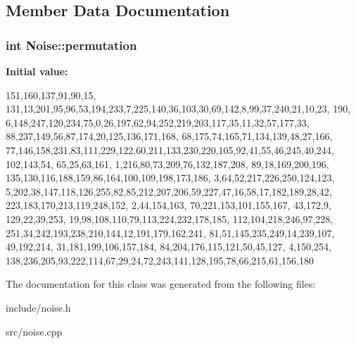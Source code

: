 \subsection{\-Member \-Data \-Documentation}
\hypertarget{classNoise_aa738807ef2d9b2ef6873e1118926b4bf}{
\subsubsection[{permutation}]{\setlength{\rightskip}{0pt plus 5cm}int \-Noise\-::permutation}}
\label{df/d15/classNoise_aa738807ef2d9b2ef6873e1118926b4bf}
{\bfseries \-Initial value\-:}
\begin{DoxyCode}
 {151,160,137,91,90,15,
131,13,201,95,96,53,194,233,7,225,140,36,103,30,69,142,8,99,37,240,21,10,23,
190, 6,148,247,120,234,75,0,26,197,62,94,252,219,203,117,35,11,32,57,177,33,
88,237,149,56,87,174,20,125,136,171,168, 68,175,74,165,71,134,139,48,27,166,
77,146,158,231,83,111,229,122,60,211,133,230,220,105,92,41,55,46,245,40,244,
102,143,54, 65,25,63,161, 1,216,80,73,209,76,132,187,208, 89,18,169,200,196,
135,130,116,188,159,86,164,100,109,198,173,186, 3,64,52,217,226,250,124,123,
5,202,38,147,118,126,255,82,85,212,207,206,59,227,47,16,58,17,182,189,28,42,
223,183,170,213,119,248,152, 2,44,154,163, 70,221,153,101,155,167, 43,172,9,
129,22,39,253, 19,98,108,110,79,113,224,232,178,185, 112,104,218,246,97,228,
251,34,242,193,238,210,144,12,191,179,162,241, 81,51,145,235,249,14,239,107,
49,192,214, 31,181,199,106,157,184, 84,204,176,115,121,50,45,127, 4,150,254,
138,236,205,93,222,114,67,29,24,72,243,141,128,195,78,66,215,61,156,180}
\end{DoxyCode}


\-The documentation for this class was generated from the following files\-:\begin{DoxyCompactItemize}
\item 
include/noise.\-h\item 
src/noise.\-cpp\end{DoxyCompactItemize}
